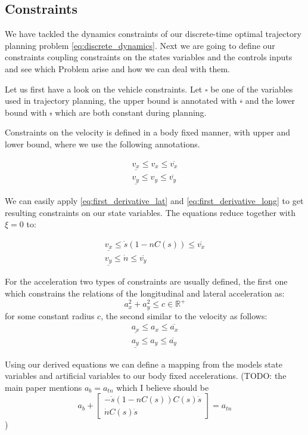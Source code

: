 \subsection{Constraints}

We have tackled the dynamics constraints of our discrete-time optimal trajectory planning problem \ref{eq:discrete_dynamics}.
Next we are going to define our constraints coupling constraints on the states variables and the controls inputs and see which Problem arise and how
we can deal with them.

Let us first have a look on the vehicle constraints.
Let $\square$ be one of the variables used in trajectory planning, the upper bound is annotated with $\overline{\square}$ and the lower bound with
$\underline{\square}$ which are both constant during planning.

Constraints on the velocity is defined in a body fixed manner, with upper and lower bound, where we use the following annotations.

\begin{align}
	\underline{v_x} \leq v_x \leq \overline{v_x} \\
	\underline{v_y} \leq v_y \leq \overline{v_y}
\end{align}

We can easily apply \ref{eq:first_derivative_lat} and \ref{eq:first_derivative_long} to get resulting constraints on our state variables.
The equations reduce together with $\xi = 0$ to:

\begin{align}
	\underline{v_x}  \leq  \dot{s}(1-nC(s))  \leq  \overline{v_x} \\
	\underline{v_y}  \leq  \dot{n}           \leq  \overline{v_y}
\end{align}

For the acceleration two types of constraints are usually defined, the first one which constrains the relations of the longitudinal and lateral acceleration as:
\begin{equation}
	a_x^2 + a_y^2 \leq c \in \mathbb{R}^+
\end{equation}
for some constant radius $c$, the second similar to the velocity as follows:
\begin{align}
	\underline{a_x} \leq a_x \leq \overline{a_x} \\
	\underline{a_y} \leq a_y \leq \overline{a_y}
\end{align}

Using our derived equations we can define a mapping from the models state variables and artificial variables to our body fixed accelerations.
(TODO: the main paper mentions $a_b = a_{tn}$ which I believe should be \[
	a_b + \begin{bmatrix}
		-\dot{s}(1-nC(s))C(s)\dot{s} \\
		\dot{n}C(s)\dot{s}
	\end{bmatrix} = a_{tn}\])

